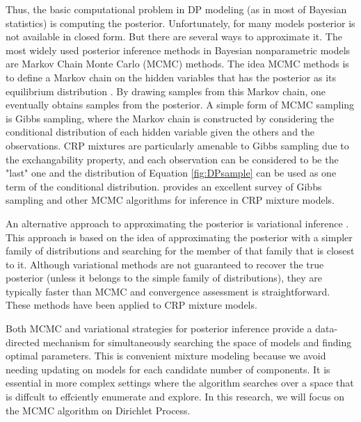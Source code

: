 	Thus, the basic computational problem in DP modeling (as in most of Bayesian statistics) is computing the posterior. Unfortunately, for many models posterior is not available in closed form. But there are several ways to approximate it. The most widely used posterior inference methods in Bayesian nonparametric models are
	Markov Chain Monte Carlo (MCMC) methods. The idea MCMC methods is to define a Markov chain on the hidden variables that has the posterior as its equilibrium distribution \cite{Andrieu2003}. By drawing samples from this Markov chain, one eventually obtains samples from the posterior. A simple form of MCMC sampling is Gibbs sampling, where the Markov chain is constructed by considering the conditional distribution of each hidden variable given the others and the observations. CRP mixtures are
	particularly amenable to Gibbs sampling due to the exchangability property, and each observation can be considered to be the "last" one and the distribution of Equation \ref{fig:DPsample} can be used as one term of the conditional distribution. \cite{Andrieu2003} provides an excellent survey of Gibbs sampling and other MCMC
	algorithms for inference in CRP mixture models.
	
	An alternative approach to approximating the posterior is variational inference \cite{Jordan1999}. This approach is based on the idea of approximating the posterior with a simpler family of distributions and searching for the member of that family that
	is closest to it. Although variational methods are not guaranteed to recover the true posterior (unless it belongs to the simple family of distributions), they are typically faster than MCMC \cite{Blei2006}and convergence assessment is straightforward. These methods have been applied to CRP mixture
	models. 
	
	Both MCMC and variational strategies for posterior inference provide a data-directed mechanism for simultaneously searching the space of models and finding optimal parameters. This is convenient  mixture modeling because we avoid needing updating on models for each candidate number of components. It is essential in more complex settings where the algorithm searches over a space that is diffcult to effciently enumerate and explore. In this research, we will focus on the MCMC algorithm on Dirichlet Process.
